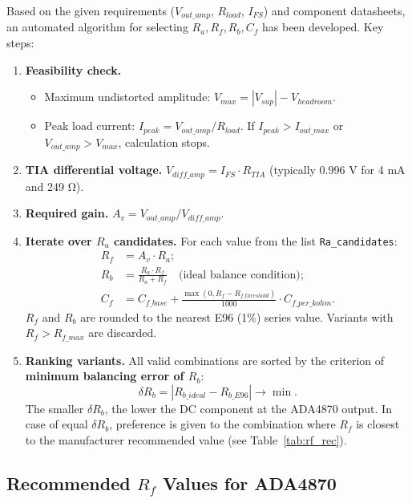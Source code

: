 \documentclass[a4paper, 12pt]{article}
\begin{document}
Based on the given requirements (\(V_{out\_amp}\), \(R_{load}\), \(I_{FS}\)) and
component datasheets, an automated algorithm for selecting \(R_a, R_f, R_b, C_f\)
has been developed. Key steps:

\begin{enumerate}
  \item \textbf{Feasibility check.}
    \begin{itemize}
      \item Maximum undistorted amplitude: \(V_{max} = |V_{sup}| - V_{headroom}\).
      \item Peak load current: \(I_{peak} = V_{out\_amp}/R_{load}\). If \(I_{peak} > I_{out\_max}\) or \(V_{out\_amp} > V_{max}\), calculation stops.
    \end{itemize}
  \item \textbf{TIA differential voltage.}
    \(V_{diff\_amp} = I_{FS} \cdot R_{TIA}\) (typically 0.996 V for 4 mA and 249 Ω).
  \item \textbf{Required gain.}
    \(A_v = V_{out\_amp} / V_{diff\_amp}\).
  \item \textbf{Iterate over \(R_a\) candidates.}
    For each value from the list \texttt{Ra\_candidates}:
    \begin{align*}
      R_f &= A_v \cdot R_a;\\
      R_b &= \frac{R_a \cdot R_f}{R_a + R_f}\quad \text{(ideal balance condition)};\\
      C_f &= C_{f\_base} + \frac{\max(0, R_f - R_{f\_threshold})}{1000} \cdot C_{f\_per\_kohm}.
    \end{align*}
    \(R_f\) and \(R_b\) are rounded to the nearest E96 (1\%) series value.
    Variants with \(R_f > R_{f\_max}\) are discarded.
  \item \textbf{Ranking variants.}
    All valid combinations are sorted by the criterion of \textbf{minimum balancing error of \(R_b\)}:
    \[
      \delta R_b = |R_{b\_ideal} - R_{b\_E96}| \to \min.
    \]
    The smaller \(\delta R_b\), the lower the DC component at the ADA4870 output. In case of equal \(\delta R_b\), preference is given to the combination where \(R_f\) is closest to the manufacturer recommended value (see Table~\ref{tab:rf_rec}).
\end{enumerate}

\subsection{Recommended \(R_f\) Values for ADA4870}
\label{sec:rf_recommendation}
\end{document}
